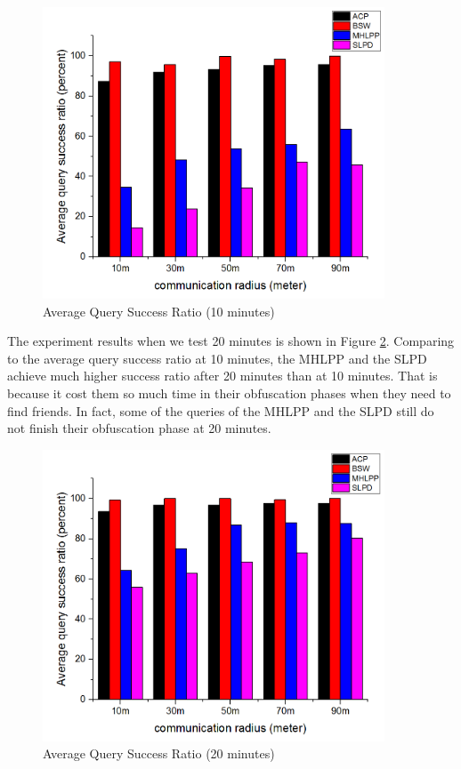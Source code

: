 \begin{figure} [hbtp]
  \centering 
  \includegraphics[width=4.0in]{figures/F414AverageQuerySuccessRatio10minutes.png}
  \caption{Average Query Success Ratio (10 minutes)} 
  \label{fig:AverageQuerySuccessRatio10} %
\end{figure}

The experiment results when we test 20 minutes is shown in Figure \ref{fig:AverageQuerySuccessRatio20}. Comparing to the average query success ratio at 10 minutes, the MHLPP and the SLPD achieve much higher success ratio after 20 minutes than at 10 minutes. That is because it cost them so much time in their obfuscation phases when they need to find friends. In fact, some of the queries of the MHLPP and the SLPD still do not finish their obfuscation phase at 20 minutes.

\begin{figure} [hbtp]
  \centering 
  \includegraphics[width=4.0in]{figures/F415AverageQuerySuccessRatio20minutes.png}
  \caption{Average Query Success Ratio (20 minutes)} 
  \label{fig:AverageQuerySuccessRatio20} %
\end{figure}

